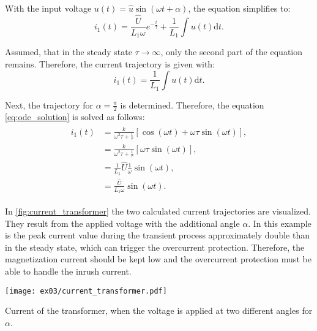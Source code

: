 \begin{solutionblock}
  With the input voltage $u(t) = \hat{u}\sin(\omega t + \alpha)$, the equation simplifies to:
  \begin{equation}
    i_{\mathrm{1}}(t) = \frac{\hat{U}}{L_{\mathrm{1}}\omega}e^{-\frac{t}{\tau}} + \frac{1}{L_{\mathrm{1}}} \int u(t) \mathrm{d}t.
  \end{equation}

  Assumed, that in the steady state $\tau \rightarrow \infty$, only the second part of the equation remains. Therefore, the current trajectory is given with:
  \begin{equation}
    i_{\mathrm{1}}(t) = \frac{1}{L_{\mathrm{1}}} \int u(t) \mathrm{d}t.
  \end{equation}

  Next, the trajectory for $\alpha = \frac{\pi}{2}$ is determined. Therefore, the equation \eqref{eq:ode_solution} is solved as follows:
  \begin{align}
    \begin{split}
      i_{\mathrm{1}}(t) &= \frac{k}{\omega^2\tau + \frac{1}{\tau}}
      \left[\cos(\omega t) + \omega \tau \sin(\omega t) \right], \\
      &= \frac{k}{\omega^2\tau + \frac{1}{\tau}} \left[\omega \tau \sin(\omega t) \right], \\
      &= \frac{1}{L_{\mathrm{1}}} \hat{U} \frac{1}{\omega} \sin(\omega t), \\
      &= \frac{\hat{U}}{L_{\mathrm{1}}\omega} \sin(\omega t).
    \end{split}
  \end{align}


  In \autoref{fig:current_transformer} the two calculated current trajectories are visualized. They result from the applied voltage with the additional angle $\alpha$.
  In this example is the peak current value during the transient process approximately double than in the steady state, which can trigger the overcurrent protection. Therefore, the magnetization current should be kept low and the overcurrent protection must be able to handle the inrush current.
  \begin{solutionfigure}[ht!]
    \centering
    \texttt{[image: ex03/current\_transformer.pdf]}
    \caption{Current of the transformer, when the voltage is applied at two different angles for $\alpha$.}
    \label{fig:current_transformer}
  \end{solutionfigure}
  

\end{solutionblock}